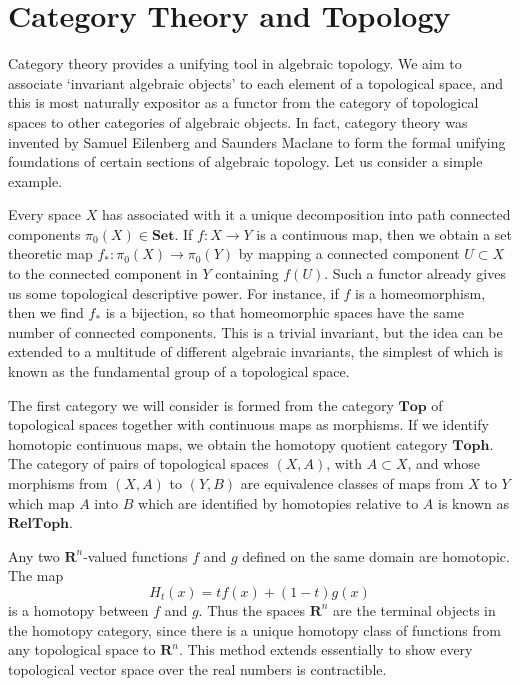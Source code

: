 \section{Category Theory and Topology}

Category theory provides a unifying tool in algebraic topology. We aim to associate `invariant algebraic objects' to each element of a topological space, and this is most naturally expositor as a functor from the category of topological spaces to other categories of algebraic objects. In fact, category theory was invented by Samuel Eilenberg and Saunders Maclane to form the formal unifying foundations of certain sections of algebraic topology. Let us consider a simple example.

\begin{example}
    Every space $X$ has associated with it a unique decomposition into path connected components $\pi_0(X) \in \textbf{Set}$. If $f:X \to Y$ is a continuous map, then we obtain a set theoretic map $f_*: \pi_0(X) \to \pi_0(Y)$ by mapping a connected component $U \subset X$ to the connected component in $Y$ containing $f(U)$. Such a functor already gives us some topological descriptive power. For instance, if $f$ is a homeomorphism, then we find $f_*$ is a bijection, so that homeomorphic spaces have the same number of connected components. This is a trivial invariant, but the idea can be extended to a multitude of different algebraic invariants, the simplest of which is known as the fundamental group of a topological space.
\end{example}

The first category we will consider is formed from the category $\textbf{Top}$ of topological spaces together with continuous maps as morphisms. If we identify homotopic continuous maps, we obtain the homotopy quotient category $\textbf{Toph}$. The category of pairs of topological spaces $(X,A)$, with $A \subset X$, and whose morphisms from $(X,A)$ to $(Y,B)$ are equivalence classes of maps from $X$ to $Y$ which map $A$ into $B$ which are identified by homotopies relative to $A$ is known as $\textbf{RelToph}$.

\begin{example}
    Any two $\mathbf{R}^n$-valued functions $f$ and $g$ defined on the same domain are homotopic. The map
    \[ H_t(x) = t f(x) + (1 - t) g(x) \]
    is a homotopy between $f$ and $g$. Thus the spaces $\mathbf{R}^n$ are the terminal objects in the homotopy category, since there is a unique homotopy class of functions from any topological space to $\mathbf{R}^n$. This method extends essentially to show every topological vector space over the real numbers is contractible.
\end{example}

